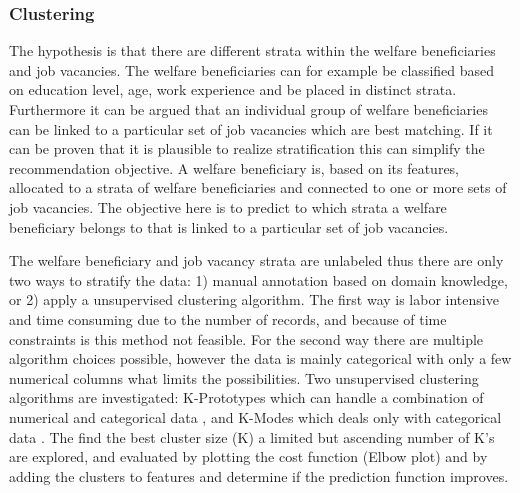 \subsubsection{Clustering}
The hypothesis is that there are different strata within the welfare beneficiaries and job vacancies. 
The welfare beneficiaries can for example be classified based on education level, age, work experience and be placed in distinct strata.
Furthermore it can be argued that an individual group of welfare beneficiaries can be linked to a particular set of job vacancies which are best matching. 
If it can be proven that it is plausible to realize stratification this can simplify the recommendation objective. 
A welfare beneficiary is, based on its features, allocated to a strata of welfare beneficiaries and connected to one or more sets of job vacancies. 
The objective here is to predict to which strata a welfare beneficiary belongs to that is linked to a particular set of job vacancies. 

The welfare beneficiary and job vacancy strata are unlabeled thus there are only two ways to stratify the data: 1) manual annotation based on domain knowledge, or 2) apply a unsupervised clustering algorithm.
The first way is labor intensive and time consuming due to the number of records, and because of time constraints is this method not feasible. 
For the second way there are multiple algorithm choices possible, however the data is mainly categorical with only a few numerical columns what limits the possibilities. 
Two unsupervised clustering algorithms are investigated: K-Prototypes which can handle a combination of numerical and categorical data \cite{huang1997clustering}, and K-Modes which deals only with categorical data \cite{huang1997clustering, huang1998extensions}.
The find the best cluster size (K) a limited but ascending number of K’s are explored, and evaluated by plotting the cost function (Elbow plot) and by adding the clusters to features and determine if the prediction function improves.

